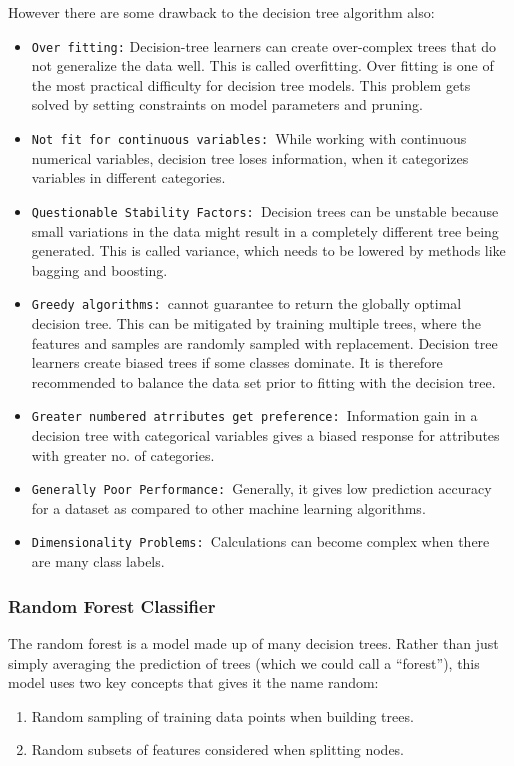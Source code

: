 \documentclass[12pt]{article}
\begin{document}
However there are some drawback to the decision tree algorithm also:
\begin{itemize}
\item
\texttt{Over fitting:} Decision-tree learners can create over-complex trees that do not generalize the data well. This is called overfitting. Over fitting is one of the most practical difficulty for decision tree models. This problem gets solved by setting constraints on model parameters and pruning.

\item
\texttt{Not fit for continuous variables: }While working with continuous numerical variables, decision tree loses information, when it categorizes variables in different categories.
\item
\texttt{Questionable Stability Factors: }Decision trees can be unstable because small variations in the data might result in a completely different tree being generated. This is called variance, which needs to be lowered by methods like bagging and boosting.
\item
\texttt{Greedy algorithms: }cannot guarantee to return the globally optimal decision tree. This can be mitigated by training multiple trees, where the features and samples are randomly sampled with replacement. Decision tree learners create biased trees if some classes dominate. It is therefore recommended to balance the data set prior to fitting with the decision tree.
\item
\texttt{Greater numbered atrributes get preference: }Information gain in a decision tree with categorical variables gives a biased response for attributes with greater no. of categories.
\item
\texttt{Generally Poor Performance: }Generally, it gives low prediction accuracy for a dataset as compared to other machine learning algorithms.
\item
\texttt{Dimensionality Problems: }Calculations can become complex when there are many class labels.
\end{itemize}

\subsubsection{Random Forest Classifier}

The random forest is a model made up of many decision trees. Rather than just simply averaging the prediction of trees (which we could call a “forest”), this model uses two key concepts that gives it the name random:
\begin{enumerate}
\item
Random sampling of training data points when building trees.
\item
Random subsets of features considered when splitting nodes.

\end{enumerate}
\end{document}
